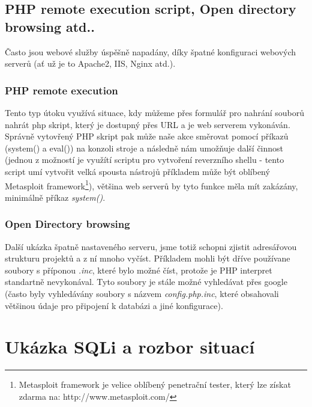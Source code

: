 \documentclass[12pt, a4paper]{report}
\begin{document}
\section {PHP remote execution script, Open directory browsing atd..}
Často jsou webové služby úspěšně napadány, díky špatné konfiguraci webových serverů (ať už je to Apache2, IIS, Nginx atd.). 
\subsection{PHP remote execution}
Tento typ útoku využívá situace, kdy můžeme přes formulář pro nahrání souborů nahrát php skript, který je dostupný přes URL a je web serverem vykonáván. Správně vytovřený PHP skript pak může naše akce směrovat pomocí příkazů (system() a eval()) na konzoli stroje a následně nám umožňuje další činnost (jednou z možností je využítí scriptu pro vytvoření reverzního shellu - tento script umí vytvořit velká spousta nástrojů příkladem může být oblíbený Metasploit framework\footnote{Metasploit framework je velice oblíbený penetrační tester, který lze získat zdarma na: http://www.metasploit.com/}), většina web serverů by tyto funkce měla mít zakázány, minimálně příkaz \emph{system()}. 
\subsection{Open Directory browsing}
Další ukázka špatně nastaveného serveru, jsme totiž schopni zjistit adresářovou strukturu projektů a z ní mnoho vyčíst. Příkladem mohli být dříve používane soubory s příponou \textit{.inc}, které bylo možné číst, protože je PHP interpret standartně nevykonával. Tyto soubory je stále možné vyhledávat přes google (často byly vyhledávány soubory s názvem \textit{config.php.inc}, které obsahovali většinou údaje pro připojení k databázi a jiné konfigurace).

\chapter{Ukázka SQLi a rozbor situací}
\end{document}
